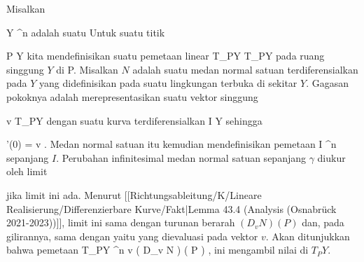 \setcounter{section}{4}


Misalkan

\mavergleichskette
{\vergleichskette
{ Y
}
{ \subseteq }{ \R^n
}
{  }{
}
{    }{
}
{   }{
}
}
{}{}{}
adalah suatu
Untuk suatu titik

\mavergleichskette
{\vergleichskette
{ P
}
{ \in }{ Y
}
{  }{
}
{    }{
}
{   }{
}
}
{}{}{}
kita mendefinisikan suatu pemetaan linear
 { T_PY } { T_PY
} {}
pada ruang singgung $Y$ di P. Misalkan $N$ adalah suatu medan normal satuan terdiferensialkan pada $Y$ yang didefinisikan pada suatu lingkungan terbuka di sekitar $Y$. Gagasan pokoknya adalah merepresentasikan suatu vektor singgung

\mavergleichskette
{\vergleichskette
{ v
}
{ \in }{ T_PY
}
{  }{
}
{    }{
}
{   }{
}
}
{}{}{}
dengan suatu kurva terdiferensialkan
\maabbdisp {\gamma} { I } { Y
} {}
sehingga

\mavergleichskettedisp
{\vergleichskette
{ \gamma'(0)
}
{ =} { v
}
{ } {
}
{ } {
}
{ } {
}
}
{}{}{.}
Medan normal satuan itu kemudian mendefinisikan pemetaan
 { I } { \R^n
} {}
sepanjang $I$. Perubahan infinitesimal medan normal satuan sepanjang $\gamma$ diukur oleh limit

 {  }

jika limit ini ada. Menurut
[[Richtungsableitung/K/Lineare Realisierung/Differenzierbare Kurve/Fakt|Lemma 43.4 (Analysis (Osnabrück 2021-2023))]],
limit ini sama dengan turunan berarah $\left(  D_{ v }  N   \right) \left(   P   \right)$ dan, pada gilirannya, sama dengan
 yaitu
yang dievaluasi pada vektor $v$. Akan ditunjukkan bahwa pemetaan
\maabbeledisp {} { T_PY } { \R^n
} {v } { \left(  D_{v}  N   \right) \left(   P   \right)
} {,}
ini mengambil nilai di $T_PY$.

